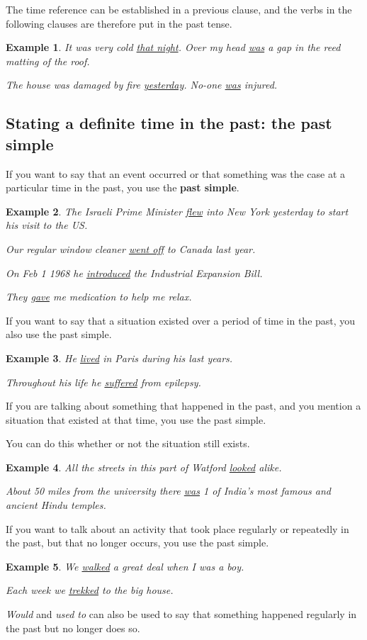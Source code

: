 \documentclass[oneside]{book}
\numberwithin{equation}{section}
\newtheorem{example}{Example}[section]
\begin{document}
The time reference can be established in a previous clause, and the verbs in the following clauses are therefore put in the past tense.
\begin{example}
    It was very cold \underline{that night}. Over my head \underline{was} a gap in the reed matting of the roof.
    
    The house was damaged by fire \underline{yesterday}. No-one \underline{was} injured.
\end{example}

\subsection{Stating a definite time in the past: the past simple}
\noindent{} If you want to say that an event occurred or that something was the case at a particular time in the past, you use the \textbf{past simple}.
\begin{example}
    The Israeli Prime Minister \underline{flew} into New York yesterday to start his visit to the US.
    
    Our regular window cleaner \underline{went off} to Canada last year.
    
    On Feb 1 1968 he \underline{introduced} the Industrial Expansion Bill.
    
    They \underline{gave} me medication to help me relax.
\end{example}
%
\noindent{} If you want to say that a situation existed over a period of time in the past, you also use the past simple.
\begin{example}
    He \underline{lived} in Paris during his last years.
    
    Throughout his life he \underline{suffered} from epilepsy.
\end{example}
%
\noindent{} If you are talking about something that happened in the past, and you mention a situation that existed at that time, you use the past simple.

You can do this whether or not the situation still exists.
\begin{example}
    All the streets in this part of Watford \underline{looked} alike.
    
    About 50 miles from the university there \underline{was} 1 of India's most famous and ancient Hindu temples.
\end{example}
%
\noindent{} If you want to talk about an activity that took place regularly or repeatedly in the past, but that no longer occurs, you use the past simple.
\begin{example}
    We \underline{walked} a great deal when I was a boy.
    
    Each week we \underline{trekked} to the big house.
\end{example}
\textit{Would} and \textit{used to} can also be used to say that something happened regularly in the past but no longer does so.
\end{document}
